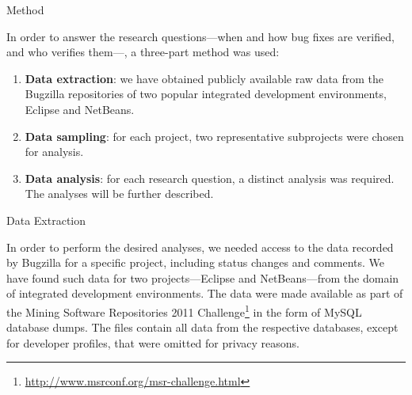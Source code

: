 \begin{section}{Method} \label{sec:method}


	In order to answer the research questions---when and how bug fixes are verified, and who verifies them---, a three-part method was used:
	
	\begin{enumerate}
		\item \textbf{Data extraction}: we have obtained publicly available raw data from the Bugzilla repositories of two popular integrated development environments, Eclipse and NetBeans.

		\item \textbf{Data sampling}: for each project, two representative subprojects were chosen for analysis.
		
		
		
		\item \textbf{Data analysis}: for each research question, a distinct analysis was required. The analyses will be further described.
	\end{enumerate}	

\begin{subsection}{Data Extraction}
	
	In order to perform the desired analyses, we needed access to the data recorded by Bugzilla for a specific project, including status changes and comments. We have found such data for two projects---Eclipse and NetBeans---from the domain of integrated development environments. The data were made available as part of the Mining Software Repositories 2011 Challenge\footnote{\url{http://www.msrconf.org/msr-challenge.html}} in the form of MySQL database dumps. The files contain all data from the respective databases, except for developer profiles, that were omitted for privacy reasons.
	


\end{subsection}
\end{section}
